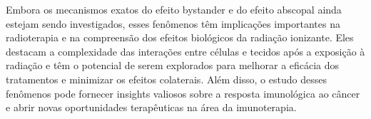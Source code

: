 \documentclass[11pt,a4paper]{article}
\begin{document}
	Embora os mecanismos exatos do efeito bystander e do efeito abscopal ainda estejam sendo investigados, esses fenômenos têm implicações importantes na radioterapia e na compreensão dos efeitos biológicos da radiação ionizante. Eles destacam a complexidade das interações entre células e tecidos após a exposição à radiação e têm o potencial de serem explorados para melhorar a eficácia dos tratamentos e minimizar os efeitos colaterais. Além disso, o estudo desses fenômenos pode fornecer insights valiosos sobre a resposta imunológica ao câncer e abrir novas oportunidades terapêuticas na área da imunoterapia.



\end{document}
